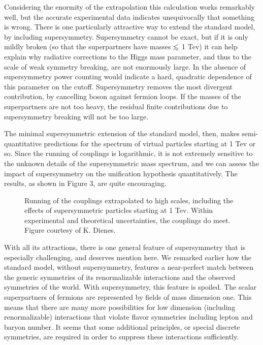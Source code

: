 \documentclass[aps,epsf]{revtex4}
\def\lsim{\mathrel{\raise.3ex\hbox{$<$}\mkern-14mu
             \lower0.6ex\hbox{$\sim$}}}
\begin{document}
Considering the enormity of the extrapolation this calculation works 
remarkably well, but the accurate experimental data indicates
unequivocally that something is wrong.  There is one particularly
attractive way to extend the standard model, by including
supersymmetry.  Supersymmetry cannot be exact, but if it is only
mildly broken (so that the superpartners have masses $\lsim$ 1 Tev) it
can help explain why radiative corrections to the Higgs mass
parameter, and thus to the scale of weak symmetry breaking, are not
enormously large.  In the absence of supersymmetry power counting
would indicate a hard, quadratic dependence of this parameter on the
cutoff.  Supersymmetry removes the most divergent contribution, by
cancelling boson against fermion loops.  If the masses of the
superpartners are not too heavy, the residual finite contributions due
to supersymmetry breaking will not be too large.  

The minimal
supersymmetric extension of the standard model, then, 
makes semi-quantitative
predictions for the spectrum of virtual particles starting at 1 Tev or
so.  Since the running of couplings is logarithmic, it is not
extremely sensitive to the unknown details of the supersymmetric mass
spectrum, and we can assess the impact of supersymmetry on the
unification hypothesis quantitatively.  The results, as shown in
Figure 3, are quite encouraging.  


\begin{figure}
\centerline{}
\smallskip
\caption{ Running of the
couplings extrapolated to high scales, including the effects of
supersymmetric particles starting at 1 Tev.  Within experimental and
theoretical uncertainties, the couplings do meet. Figure courtesy of
K. Dienes. }
\label{fig3}
\end{figure}



With all its
attractions, there is one general feature of supersymmetry that is
especially challenging, and deserves mention here.  We remarked
earlier how the standard model, without supersymmetry, features a
near-perfect match between the generic symmetries of its renormalizable
interactions and the observed symmetries of the world.  With
supersymmetry, this feature is spoiled.  The scalar superpartners of
fermions are represented by fields of mass dimension one.  This means
that there are many more possibilities for low dimension (including
renormalizable) interactions that violate flavor symmetries including
lepton and baryon number.  It seems that some additional principles,
or special discrete symmetries, are required in order to suppress
these interactions sufficiently.
\end{document}

